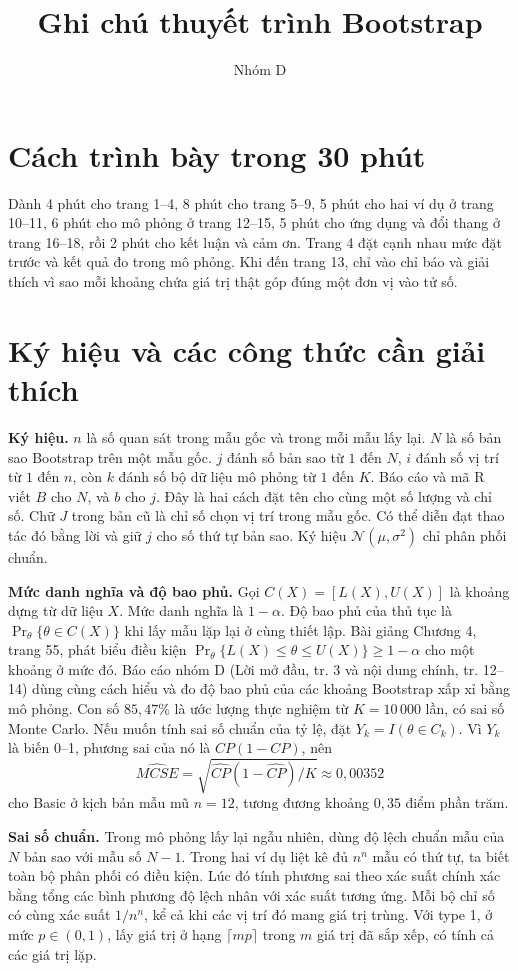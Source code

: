 \documentclass[11pt,a4paper]{article}
\title{Ghi chú thuyết trình Bootstrap}
\author{Nhóm D}
\date{}
\begin{document}
\maketitle

\section{Cách trình bày trong 30 phút}
Dành 4 phút cho trang 1--4, 8 phút cho trang 5--9, 5 phút cho hai ví dụ
ở trang 10--11, 6 phút cho mô phỏng ở trang 12--15, 5 phút cho ứng dụng
và đổi thang ở trang 16--18, rồi 2 phút cho kết luận và cảm ơn.
Trang 4 đặt cạnh nhau mức đặt trước và kết quả đo trong mô phỏng.
Khi đến trang 13, chỉ vào chỉ báo và giải thích vì sao mỗi khoảng
chứa giá trị thật góp đúng một đơn vị vào tử số.

\section{Ký hiệu và các công thức cần giải thích}
\textbf{Ký hiệu.}
$n$ là số quan sát trong mẫu gốc và trong mỗi mẫu lấy lại.
$N$ là số bản sao Bootstrap trên một mẫu gốc. $j$ đánh số bản sao từ $1$ đến $N$,
$i$ đánh số vị trí từ $1$ đến $n$, còn $k$ đánh số bộ dữ liệu mô phỏng từ $1$ đến $K$.
Báo cáo và mã R viết $B$ cho $N$, và $b$ cho $j$. Đây là hai cách đặt tên cho
cùng một số lượng và chỉ số. Chữ $J$ trong bản cũ là chỉ số chọn vị trí
trong mẫu gốc. Có thể diễn đạt thao tác đó bằng lời và giữ $j$ cho số thứ tự bản sao.
Ký hiệu $\mathcal N(\mu,\sigma^2)$ chỉ phân phối chuẩn.

\textbf{Mức danh nghĩa và độ bao phủ.}
Gọi $C(X)=[L(X),U(X)]$ là khoảng dựng từ dữ liệu $X$.
Mức danh nghĩa là $1-\alpha$. Độ bao phủ của thủ tục là
$\Pr_\theta\{\theta\in C(X)\}$ khi lấy mẫu lặp lại ở cùng thiết lập.
Bài giảng Chương 4, trang 55, phát biểu điều kiện
$\Pr_\theta\{L(X)\le\theta\le U(X)\}\ge1-\alpha$ cho một khoảng ở mức đó.
Báo cáo nhóm D (Lời mở đầu, tr. 3 và nội dung chính, tr. 12--14) dùng cùng cách hiểu và đo độ bao phủ
của các khoảng Bootstrap xấp xỉ bằng mô phỏng. Con số $85{,}47\%$
là ước lượng thực nghiệm từ $K=10\,000$ lần, có sai số Monte Carlo.
Nếu muốn tính sai số chuẩn của tỷ lệ, đặt $Y_k=I(\theta\in C_k)$.
Vì $Y_k$ là biến 0--1, phương sai của nó là $CP(1-CP)$, nên
\[
    \widehat{MCSE}=\sqrt{\widehat{CP}(1-\widehat{CP})/K}
        \approx 0{,}00352
\]
cho Basic ở kịch bản mẫu mũ $n=12$, tương đương khoảng $0{,}35$ điểm phần trăm.

\textbf{Sai số chuẩn.}
Trong mô phỏng lấy lại ngẫu nhiên, dùng độ lệch chuẩn mẫu của $N$ bản sao
với mẫu số $N-1$. Trong hai ví dụ liệt kê đủ $n^n$ mẫu có thứ tự, ta biết
toàn bộ phân phối có điều kiện. Lúc đó tính phương sai theo xác suất chính
xác bằng tổng các bình phương độ lệch nhân với xác suất tương ứng.
Mỗi bộ chỉ số có cùng xác suất $1/n^n$, kể cả khi các vị trí đó mang giá trị trùng.
Với type 1, ở mức $p\in(0,1)$, lấy giá trị ở hạng $\lceil mp\rceil$
trong $m$ giá trị đã sắp xếp, có tính cả các giá trị lặp.
\end{document}
